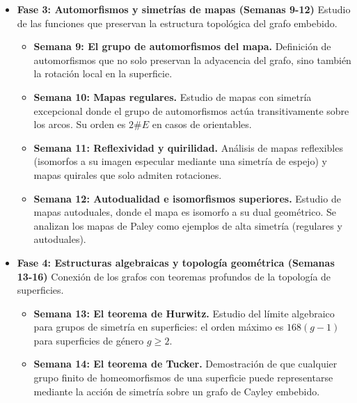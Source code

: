 \documentclass{article}
\begin{document}
\begin{itemize}
\begin{itemize}
             \item \textbf{Semana 7: Dualidad geométrica.} Construcción del grafo dual colocando vértices en el interior de las 2-celdas del primal. Se estudia la propiedad de que el dual del dual recupera el grafo original.
             \item \textbf{Semana 8: Dualidad algebraica y rotaciones.} Introducción a los duales algebraicos (Whitney) basados en espacios de ciclos y cociclos. Se presenta el esquema de rotación (permutación cíclica de aristas) como la base algebraica para definir simetrías.
          \end{itemize}
       \item \textbf{Fase 3: Automorfismos y simetrías de mapas (Semanas 9-12)} Estudio de las funciones que preservan la estructura topológica del grafo embebido.
          \begin{itemize}
             \item \textbf{Semana 9: El grupo de automorfismos del mapa.} Definición de automorfismos que no solo preservan la adyacencia del grafo, sino también la rotación local en la superficie.
             \item \textbf{Semana 10: Mapas regulares.} Estudio de mapas con simetría excepcional donde el grupo de automorfismos actúa transitivamente sobre los arcos. Su orden es $2 \# E$ en casos de orientables.
             \item \textbf{Semana 11: Reflexividad y quirilidad.} Análisis de mapas reflexibles (isomorfos a su imagen especular mediante una simetría de espejo) y mapas quirales que solo admiten rotaciones.
             \item \textbf{Semana 12: Autodualidad e isomorfismos superiores.} Estudio de mapas autoduales, donde el mapa es isomorfo a su dual geométrico. Se analizan los mapas de Paley como ejemplos de alta simetría (regulares y autoduales).
          \end{itemize}
       \item \textbf{Fase 4: Estructuras algebraicas y topología geométrica (Semanas 13-16)} Conexión de los grafos con teoremas profundos de la topología de superficies.
          \begin{itemize}
             \item \textbf{Semana 13: El teorema de Hurwitz.} Estudio del límite algebraico para grupos de simetría en superficies: el orden máximo es $168(g-1)$ para superficies de género $g\geq 2$.
             \item \textbf{Semana 14: El teorema de Tucker.} Demostración de que cualquier grupo finito de homeomorfismos de una superficie puede representarse mediante la acción de simetría sobre un grafo de Cayley embebido.

\end{itemize}
\end{itemize}
\end{document}
